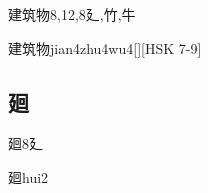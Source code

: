 \begin{Entry}{建筑物}{8,12,8}{⼵,⽵,⽜}
  \begin{Phonetics}{建筑物}{jian4zhu4wu4}[][HSK 7-9]
  \end{Phonetics}
\end{Entry}

\subsection*{廻}

\begin{Entry}{廻}{8}{⼵}
  \begin{Phonetics}{廻}{hui2}
  \end{Phonetics}
\end{Entry}


